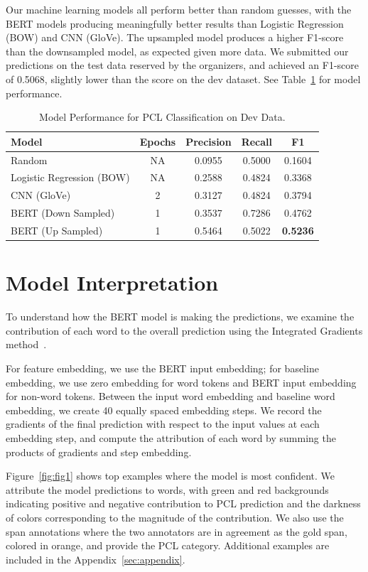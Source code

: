 \documentclass[11pt]{article}
\begin{document}
Our machine learning models all perform better than random guesses, with the BERT models producing meaningfully better results than Logistic Regression (BOW) and CNN (GloVe). The upsampled model produces a higher F1-score than the downsampled model, as expected given more data. We submitted our predictions on the test data reserved by the organizers, and achieved an F1-score of 0.5068, slightly lower than the score on the dev dataset. See Table~\ref{tab:perf} for model performance.


\begin{table}
\centering
\begin{tabular}{lcccc}
\hline
\textbf{Model} & \textbf{Epochs} & \textbf{Precision} & \textbf{Recall} & \textbf{F1} \\
\hline
Random & NA & 0.0955 & 0.5000 & 0.1604  \\
Logistic Regression (BOW) & NA & 0.2588 & 0.4824 & 0.3368  \\
CNN (GloVe) & 2 & 0.3127 & 0.4824 & 0.3794  \\
BERT (Down Sampled) & 1 & 0.3537 & 0.7286 & 0.4762  \\
BERT (Up Sampled) & 1 & 0.5464 & 0.5022 & \textbf{0.5236}  \\
\hline
\end{tabular}
\caption{Model Performance for PCL Classification on Dev Data.}
\label{tab:perf}
\end{table}

\section{Model Interpretation}

To understand how the BERT model is making the predictions, we examine the contribution of each word to the overall prediction using the Integrated Gradients method~\cite{sundararajan2017axiomatic}. 

For feature embedding, we use the BERT input embedding; for baseline embedding, we use zero embedding for word tokens and BERT input embedding for non-word tokens. Between the input word embedding and baseline word embedding, we create 40 equally spaced embedding steps. We record the gradients of the final prediction with respect to the input values at each embedding step, and compute the attribution of each word by summing the products of gradients and step embedding.

Figure~\ref{fig:fig1} shows top examples where the model is most confident. We attribute the model predictions to words, with green and red backgrounds indicating positive and negative contribution to PCL prediction and the darkness of colors corresponding to the magnitude of the contribution. We also use the span annotations where the two annotators are in agreement as the gold span, colored in orange, and provide the PCL category. Additional examples are included in the Appendix~\ref{sec:appendix}.
\end{document}
